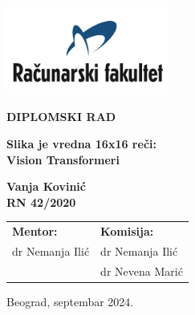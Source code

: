 \documentclass[12pt]{article}
\begin{document}
   \begin{titlepage}
      \begin{center}
         
         \vspace*{-1in}
         \includegraphics[width=0.4\textwidth]{raf_logo.png}

         \vspace{1in}
         \Large
         \textbf{DIPLOMSKI RAD}
         
         \vspace{1in}
         \Huge
         \textbf{Slika je vredna 16x16 reči: \\ Vision Transformeri}
         
         \vspace{1in}


         \fontsize{14pt}{18pt}\selectfont
         \textbf{Vanja Kovinić} \\
         \textbf{RN 42/2020}
         \vspace*{1.5in}
         
         \begin{center}
            \normalsize
            \begin{tabular}{p{} p{}}
               \fontsize{14pt}{18pt}\selectfont   
               \textbf{Mentor:} & 
            
               \fontsize{14pt}{18pt}\selectfont
               \textbf{Komisija:} \\
               dr Nemanja Ilić & dr Nemanja Ilić \\
                                 & dr Nevena Marić \\
            \end{tabular}
         \end{center}

         \vspace*{\fill}

         \normalsize
         Beograd, septembar 2024.


         
      \end{center}
   \end{titlepage}
   \restoregeometry %
\end{document}
